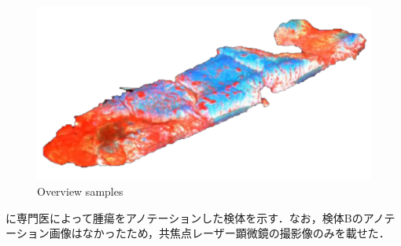 \begin{figure}[H]
\begin{minipage}{0.45\columnwidth}
	\end{minipage}
	\begin{minipage}{0.45\linewidth}
		\centering
		\includegraphics[clip, width=\linewidth]{fig/chapter3/3d_samples/sample_D_clip}
	\end{minipage}
	
	\caption{Overview samples}
	\label{fig:3D検体一覧}
	
\end{figure}


に専門医によって腫瘍をアノテーションした検体を示す．なお，検体Bのアノテーション画像はなかったため，共焦点レーザー顕微鏡の撮影像のみを載せた．

